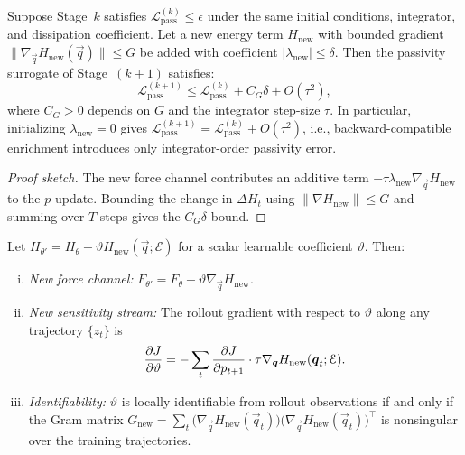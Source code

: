 \begin{theorem}
\label{thm:enrich_stability}
Suppose Stage~$k$ satisfies $\mathcal{L}_{\mathrm{pass}}^{(k)}\leq\epsilon$
under the same initial conditions, integrator, and dissipation coefficient.
Let a new energy term $H_{\mathrm{new}}$ with bounded gradient
$\|\nabla_{\vec{q}} H_{\mathrm{new}}(\vec{q})\|\leq G$ be added with
coefficient $|\lambda_{\mathrm{new}}|\leq\delta$.
Then the passivity surrogate of Stage~$(k+1)$ satisfies:
\[
  \mathcal{L}_{\mathrm{pass}}^{(k+1)}
  \leq \mathcal{L}_{\mathrm{pass}}^{(k)} + C_G\delta + O(\tau^2),
\]
where $C_G>0$ depends on $G$ and the integrator step-size $\tau$.
In particular, initializing $\lambda_{\mathrm{new}}=0$ gives
$\mathcal{L}_{\mathrm{pass}}^{(k+1)} = \mathcal{L}_{\mathrm{pass}}^{(k)}
+ O(\tau^2)$, i.e., backward-compatible enrichment introduces
only integrator-order passivity error.
\end{theorem}

\begin{proof}[Proof sketch]
The new force channel contributes an additive term
$-\tau\lambda_{\mathrm{new}}\nabla_{\vec{q}} H_{\mathrm{new}}$ to the
$p$-update.
Bounding the change in $\Delta H_t$ using $\|\nabla H_{\mathrm{new}}\|\leq G$
and summing over $T$ steps gives the $C_G\delta$ bound.
\end{proof}

\begin{theorem}
\label{thm:enrichment_rigorous}
Let $H_{\theta'} = H_\theta + \vartheta H_{\mathrm{new}}(\vec{q};\mathcal{E})$
for a scalar learnable coefficient $\vartheta$.
Then:
\begin{enumerate}[(i)]
  \item \emph{New force channel:}
        $F_{\theta'} = F_\theta - \vartheta\nabla_{\vec{q}}H_{\mathrm{new}}$.
  \item \emph{New sensitivity stream:} The rollout gradient with respect to
        $\vartheta$ along any trajectory $\{z_t\}$ is
        \[
          \frac{\partial J}{\partial\vartheta}
          = -\sum_t
            \frac{\partial J}{\partial p_{t+1}}
            \cdot
            \tau\nabla_{\boldsymbol{q}}H_{\mathrm{new}}(\boldsymbol{q}_t;\mathcal{E}).
        \]
  \item \emph{Identifiability:} $\vartheta$ is locally identifiable
        from rollout observations if and only if the Gram matrix
        $G_{\mathrm{new}} = \sum_t
        \bigl(\nabla_{\vec{q}}H_{\mathrm{new}}(\vec{q}_t)\bigr)
        \bigl(\nabla_{\vec{q}}H_{\mathrm{new}}(\vec{q}_t)\bigr)^\top$
        is nonsingular over the training trajectories.
\end{enumerate}
\end{theorem}

